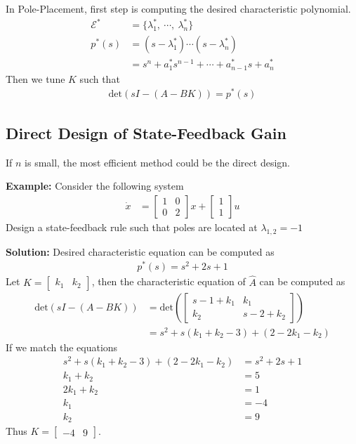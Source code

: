 \documentclass[twoside]{article}
\begin{document}
In Pole-Placement, first step is computing the desired 
characteristic polynomial. 
%
\begin{align*}
 \mathcal{E}^* &= \lbrace \lambda_1^* , \ \cdots, \  \lambda_n^*
                 \rbrace
  \\
  p^*(s) &= \left( s - \lambda_1^* \right) \cdots \left( s - \lambda_n^*
         \right)                         
  \\
  &= s^n + a_1^* s^{n-1} + \cdots + a_{n-1}^* s + a_n^*
\end{align*}
%
Then we tune $K$ such that 
\begin{align*}
  \mathrm{det} \left( s I - ( A - B K ) \right) = p^*(s)
\end{align*}

\subsection{Direct Design of State-Feedback Gain}

If $n$ is small, the most efficient method could be the direct
design. 

\textbf{Example:} Consider the following system
%
\begin{align*}
 \dot{x} &= \left[ \begin{array}{cc} 1 & 0 \\ 0 & 2 \end{array} \right] x
    + \left[ \begin{array}{c} 1 \\ 1 \end{array} \right] u
\end{align*}
% 
Design a state-feedback rule such that poles are located at 
$\lambda_{1,2} = -1$ 

\textbf{Solution:} Desired characteristic equation can be computed as
%
\begin{align*}
  p^*(s) = s^2 + 2 s + 1
\end{align*}
%
Let $K = \left[ \begin{array}{cc} k_1 & k_2 \end{array} \right]$, then
the characteristic equation of $\hat{A}$ can be computed as
%
\begin{align*}
  \mathrm{det} \left( s I - ( A - B K ) \right) &= 
  \mathrm{det} \left(
  \left[ \begin{array}{cc} s - 1 + k_1 & k_1 \\ k_2 & s - 2 + k_2 \end{array} \right]
  \right)
\\
&= s^2 + s (k_1 + k_2 - 3) + (2 -2 k_1 - k_2)
\end{align*}
%
If we match the equations
%
\begin{align*}
s^2 + s (k_1 + k_2 - 3) + (2 -2 k_1 - k_2) &= s^2 + 2 s + 1
\\
k_1 + k_2 &= 5
\\
2k_1 + k_2 &= 1
\\
k_1 &= -4
\\
k_2 &= 9
\end{align*}
%
Thus $K = \left[ \begin{array}{cc} -4 & 9 \end{array} \right]$.
\end{document}
